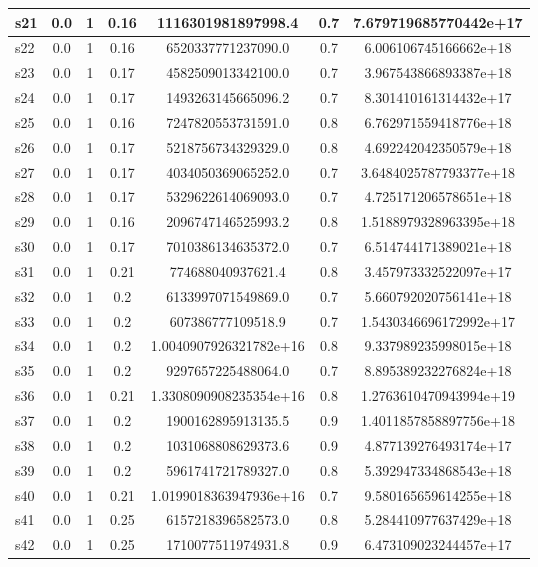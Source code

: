 \documentclass{article}
\begin{document}
\begin{tabular}{|l|c|c|c|c|c|c|}
\hline
s21 &0.0 & 1 & 0.16 & 1116301981897998.4 & 0.7 & 7.679719685770442e+17\\
\hline
s22 &0.0 & 1 & 0.16 & 6520337771237090.0 & 0.7 & 6.006106745166662e+18\\
\hline
s23 &0.0 & 1 & 0.17 & 4582509013342100.0 & 0.7 & 3.967543866893387e+18\\
\hline
s24 &0.0 & 1 & 0.17 & 1493263145665096.2 & 0.7 & 8.301410161314432e+17\\
\hline
s25 &0.0 & 1 & 0.16 & 7247820553731591.0 & 0.8 & 6.762971559418776e+18\\
\hline
s26 &0.0 & 1 & 0.17 & 5218756734329329.0 & 0.8 & 4.692242042350579e+18\\
\hline
s27 &0.0 & 1 & 0.17 & 4034050369065252.0 & 0.7 & 3.6484025787793377e+18\\
\hline
s28 &0.0 & 1 & 0.17 & 5329622614069093.0 & 0.7 & 4.725171206578651e+18\\
\hline
s29 &0.0 & 1 & 0.16 & 2096747146525993.2 & 0.8 & 1.5188979328963395e+18\\
\hline
s30 &0.0 & 1 & 0.17 & 7010386134635372.0 & 0.7 & 6.514744171389021e+18\\
\hline
s31 &0.0 & 1 & 0.21 & 774688040937621.4 & 0.8 & 3.457973332522097e+17\\
\hline
s32 &0.0 & 1 & 0.2 & 6133997071549869.0 & 0.7 & 5.660792020756141e+18\\
\hline
s33 &0.0 & 1 & 0.2 & 607386777109518.9 & 0.7 & 1.5430346696172992e+17\\
\hline
s34 &0.0 & 1 & 0.2 & 1.0040907926321782e+16 & 0.8 & 9.337989235998015e+18\\
\hline
s35 &0.0 & 1 & 0.2 & 9297657225488064.0 & 0.7 & 8.895389232276824e+18\\
\hline
s36 &0.0 & 1 & 0.21 & 1.3308090908235354e+16 & 0.8 & 1.2763610470943994e+19\\
\hline
s37 &0.0 & 1 & 0.2 & 1900162895913135.5 & 0.9 & 1.4011857858897756e+18\\
\hline
s38 &0.0 & 1 & 0.2 & 1031068808629373.6 & 0.9 & 4.877139276493174e+17\\
\hline
s39 &0.0 & 1 & 0.2 & 5961741721789327.0 & 0.8 & 5.392947334868543e+18\\
\hline
s40 &0.0 & 1 & 0.21 & 1.0199018363947936e+16 & 0.7 & 9.580165659614255e+18\\
\hline
s41 &0.0 & 1 & 0.25 & 6157218396582573.0 & 0.8 & 5.284410977637429e+18\\
\hline
s42 &0.0 & 1 & 0.25 & 1710077511974931.8 & 0.9 & 6.473109023244457e+17\\

\end{tabular}
\end{document}
